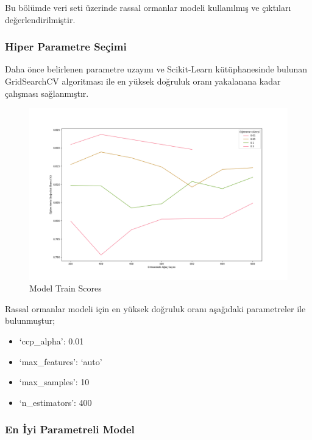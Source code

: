 \documentclass[12pt,twoside]{deuthesis}
\providecommand{\tightlist}{%
  \setlength{\itemsep}{0pt}\setlength{\parskip}{0pt}}
\begin{document}
Bu bölümde veri seti üzerinde rassal ormanlar modeli kullanılmış ve çıktıları değerlendirilmiştir.

\hypertarget{hiper-parametre-seuxe7imi-5}{%
\subsubsection{Hiper Parametre Seçimi}\label{hiper-parametre-seuxe7imi-5}}

Daha önce belirlenen parametre uzayını ve Scikit-Learn kütüphanesinde bulunan GridSearchCV algoritması ile en yüksek doğruluk oranı yakalanana kadar çalışması sağlanmıştır.
\begin{figure}

{\centering \includegraphics[width=1.1\linewidth,height=0.55\textheight]{figure/RF_bin_Grid_Graph} 

}

\caption{Model Train Scores}\label{fig:unnamed-chunk-55}
\end{figure}
Rassal ormanlar modeli için en yüksek doğruluk oranı aşağıdaki parametreler ile bulunmuştur;
\begin{itemize}
\tightlist
\item
  `ccp\_alpha': 0.01\\
\item
  `max\_features': `auto'\\
\item
  `max\_samples': 10\\
\item
  `n\_estimators': 400\\
  \newpage  
\end{itemize}
\hypertarget{en-iyi-parametreli-model-3}{%
\subsubsection{En İyi Parametreli Model}\label{en-iyi-parametreli-model-3}}
\end{document}

